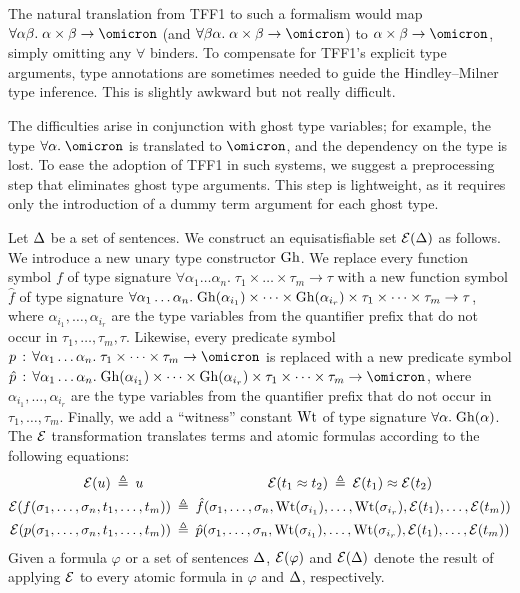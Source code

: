 The natural translation from TFF1 to such a formalism would map $\forall
\alpha\beta.\; \alpha\times\beta\to\omicron$ (and $\forall \beta\alpha.\;
\alpha\times\beta\to\omicron$) to $\alpha\times\beta\to\omicron$, simply
omitting any $\forall$ binders. To compensate for TFF1's explicit type
arguments, type annotations are sometimes needed to guide the Hindley--Milner
type inference. This is slightly awkward but not really difficult.

The difficulties arise in conjunction with ghost type variables; for example,
the type $\forall\alpha.\;\omicron$ is translated to $\omicron$, and the
dependency on the type is lost.
%
To ease the adoption of TFF1 in such systems, we suggest a preprocessing step
that eliminates ghost type arguments. This step is lightweight, as it requires
only the introduction of a dummy term argument for each ghost type.


Let $\mathrm{\Delta}$ be a set of sentences.
We construct an equisatisfiable set $\mathcal{E}(\mathrm{\Delta})$ as follows.
%
We introduce a new unary type constructor $\mathrm{Gh}$.
We replace every function symbol $f$ of type signature
$\forall \alpha_1\dots\alpha_n .\; \tau_1 \times \dots \times \tau_m \to \tau$
with a new function symbol $\hat{f}$ of type signature
$\forall \alpha_1\dots\alpha_n .\;
\mathrm{Gh}(\alpha_{i_1}) \times \dots \times \mathrm{Gh}(\alpha_{i_r}) \times
\tau_1 \times \dots \times \tau_m \to \tau$,
where $\alpha_{i_1},\dots,\alpha_{i_r}$ are the type
variables from the quantifier prefix that do not occur in
$\tau_1,\dots,\tau_m,\tau$.
Likewise, every predicate symbol $p \,\ty\,
\forall \alpha_1\dots\alpha_n .\; \tau_1 \times \dots \times \tau_m \to \omicron$
is replaced with a new predicate symbol $\hat{p} \,\ty\,
\forall \alpha_1\dots\alpha_n .\;
\ghost(\alpha_{i_1}) \times \dots \times \ghost(\alpha_{i_r}) \times
\tau_1 \times \dots \times \tau_m \to \omicron$,
where $\alpha_{i_1},\dots,\alpha_{i_r}$ are the type
variables from the quantifier prefix that do not occur in
$\tau_1,\dots,\tau_m$.
Finally, we add a ``witness'' constant $\mathrm{Wt}$
of type signature $\forall \alpha.\;\mathrm{Gh}(\alpha)$.
The $\mathcal{E}$ transformation translates terms and atomic
formulas according to the following equations:
\begin{align*}
\mathcal{E}(u) \:\triangleq\: u
\quad\quad & \qquad\qquad\qquad\quad
\mathcal{E}(t_1 \approx t_2) \:\triangleq\: \mathcal{E}(t_1) \approx \mathcal{E}(t_2) \\
\mathcal{E}(f(\sigma_1,\dots,\sigma_n,t_1,\dots,t_m)) &\:\triangleq\:
\hat{f}(\sigma_1,\dots,\sigma_n,\mathrm{Wt}(\sigma_{i_1}),\dots,\mathrm{Wt}(\sigma_{i_r}),
\mathcal{E}(t_1),\dots,\mathcal{E}(t_m)) \\
\mathcal{E}(p(\sigma_1,\dots,\sigma_n,t_1,\dots,t_m)) &\:\triangleq\:
\hat{p}(\sigma_1,\dots,\sigma_n,\mathrm{Wt}(\sigma_{i_1}),\dots,\mathrm{Wt}(\sigma_{i_r}),
\mathcal{E}(t_1),\dots,\mathcal{E}(t_m))
\end{align*}
Given a formula $\varphi$ or a set of sentences $\mathrm{\Delta}$,
$\mathcal{E}(\varphi)$ and $\mathcal{E}(\mathrm{\Delta})$ denote the result of
applying $\mathcal{E}$ to every atomic formula in $\varphi$ and
$\mathrm{\Delta}$, respectively.

